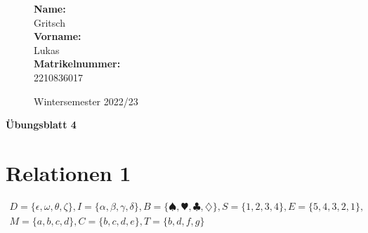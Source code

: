 \documentclass[10pt,ngerman]{scrartcl}
\begin{document}
\begin{figure}[htbp]
\begin{minipage}[b]{0.50\linewidth}
\begin{Large}

	\textbf{Name:}\\
	Gritsch 			\\
	\textbf{Vorname:}\\
	Lukas 				\\
	\textbf{Matrikelnummer:}\\
	2210836017

\end{Large}
\end{minipage}
\begin{minipage}[b]{0.50\linewidth}
\begin{flushright}
\begin{Huge}
\end{Huge}
\vspace{10px}
\begin{large}
Wintersemester 2022/23
\end{large}
\end{flushright}
\end{minipage}
\end{figure}

\vspace{20px}
\begin{huge}
\noindent

\textbf{Übungsblatt 4}
\end{huge}

\pagebreak
\section{Relationen 1}
\begin{align*}
D = \{\epsilon,\omega, \theta, \zeta\}, I = \{\alpha, \beta,\gamma, \delta\}, B = \{\spadesuit, \varheart, \clubsuit, \diamondsuit\}, S = \{1, 2, 3, 4\}, E = \{5, 4, 3, 2, 1\},\\
M = \{a, b, c, d\}, C = \{b, c, d, e\}, T = \{b, d, f , g\}
\end{align*}
\end{document}
